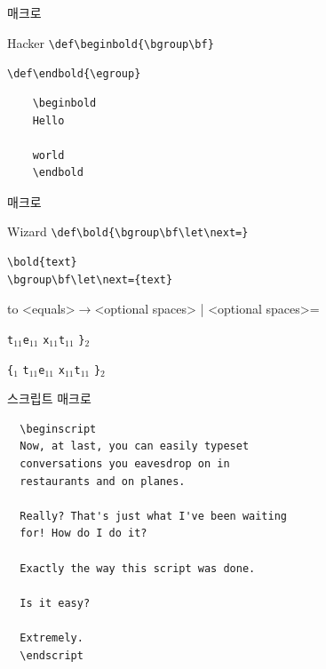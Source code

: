 \documentclass{beamer}
\begin{document}
%
\begin{frame}[fragile]{\texttt{\string\bold} 매크로}
  \begin{alertblock}{Hacker}
    \verb+\def\beginbold{\bgroup\bf}+
    
    \verb+\def\endbold{\egroup}+
  \end{alertblock}

\begin{verbatim}
    \beginbold
    Hello

    world
    \endbold
\end{verbatim}
\end{frame}


%
\begin{frame}[fragile]{\texttt{\string\bold} 매크로}
  \begin{alertblock}{Wizard}
    \verb+\def\bold{\bgroup\bf\let\next=}+
  \end{alertblock}

\begin{verbatim}
\bold{text}
\bgroup\bf\let\next={text}
\end{verbatim}

  \hbox to
  <equals>$\rightarrow$<optional spaces> | <optional spaces>=

\bigskip

  \quad{}\quad
  \verb|t|$_{11}$\quad\verb|e|$_{11}$\quad
  \verb|x|$_{11}$\quad\verb|t|$_{11}$\quad
  \verb|}|$_{2}$

  \verb|{|$_1$\quad{}\quad
  \verb|t|$_{11}$\quad\verb|e|$_{11}$\quad
  \verb|x|$_{11}$\quad\verb|t|$_{11}$\quad
  \verb|}|$_{2}$
\end{frame}


%
\begin{frame}[fragile]{스크립트 매크로}
  \small
\begin{verbatim}
  \beginscript
  Now, at last, you can easily typeset
  conversations you eavesdrop on in
  restaurants and on planes.
  
  Really? That's just what I've been waiting
  for! How do I do it?
  
  Exactly the way this script was done.
  
  Is it easy?
  
  Extremely.
  \endscript
\end{verbatim}
\end{frame}


%
\newcount\spk
\def\beginscript{\bgroup \parindent=0pt \rm \spk=1 \rightskip.4in
  \def\par{\ifnum\spk=1 \endgraf \sl \spk=2 \leftskip.4in \rightskip0in
    \else \endgraf \rm \spk=1 \leftskip0in \rightskip.4in \fi}}
\def\endscript {\egroup}
\end{document}
